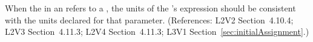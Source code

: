 When the  in an \InitialAssignment refers to a \Parameter,
the units of the \InitialAssignment's  expression should be
consistent with the units declared for that parameter.  (References: L2V2
Section~4.10.4; L2V3 Section~4.11.3; L2V4 Section~4.11.3; 
L3V1 Section~\ref{sec:initialAssignment}.)

